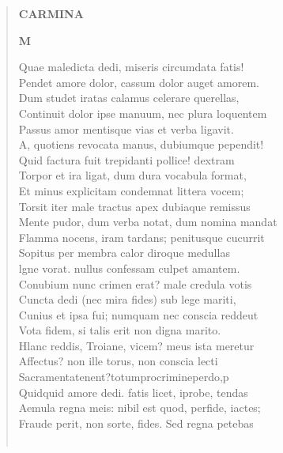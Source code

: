 \documentclass[11pt, a4paper]{report}
\begin{document}
\begin{verse}
    \begin{center} \textbf{CARMINA} \end{center}\begin{center} \textbf{M} \end{center}Quae maledicta dedi, miseris circumdata fatis! \\ Pendet amore dolor, cassum dolor auget amorem. \\ Dum studet iratas calamus celerare querellas, \\ Continuit dolor ipse manuum, nec plura loquentem \\ Passus amor mentisque vias et verba ligavit. \\ A, quotiens revocata manus, dubiumque pependit! \\ Quid factura fuit trepidanti pollice! dextram \\ Torpor et ira ligat, dum dura vocabula format, \\ Et minus explicitam condemnat littera vocem; \\ Torsit iter male tractus apex dubiaque remissus \\ Mente pudor, dum verba notat, dum nomina mandat \\ Flamma nocens, iram tardans; penitusque cucurrit \\ Sopitus per membra calor diroque medullas \\ lgne vorat. nullus confessam culpet amantem. \\ Conubium nunc crimen erat? male credula votis \\ Cuncta dedi (nec mira fides) sub lege mariti, \\ Cunius et ipsa fui; numquam nec conscia reddeut \\ Vota fidem, si talis erit non digna marito. \\ Hlanc reddis, Troiane, vicem? meus ista meretur \\ Affectus? non ille torus, non conscia lecti \\ Sacramentatenent?totumprocrimineperdo,p \\ Quidquid amore dedi. fatis licet, iprobe, tendas \\ Aemula regna meis: nibil est quod, perfide, iactes; \\ Fraude perit, non sorte, fides. Sed regna petebas \\ 
        ﻿\pagebreak 

\end{verse}
\end{document}
